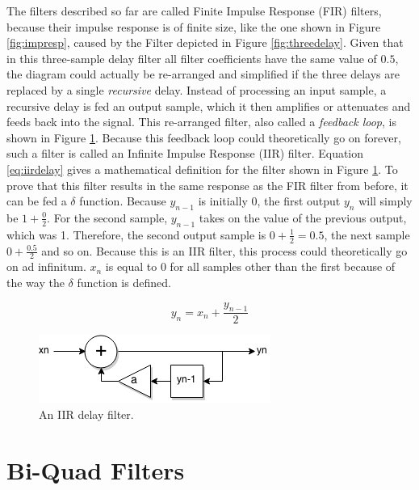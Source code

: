 \documentclass[12pt,twoside]{report}
\begin{document}
\noindent The filters described so far are called Finite Impulse Response (FIR) filters, because their impulse response is of finite size, like the one shown in Figure \ref{fig:impresp}, caused by the Filter depicted in Figure \ref{fig:threedelay}. Given that in this three-sample delay filter all filter coefficients have the same value of $0.5$, the diagram could actually be re-arranged and simplified if the three delays are replaced by a single \emph{recursive} delay. Instead of processing an input sample, a recursive delay is fed an output sample, which it then amplifies or attenuates and feeds back into the signal. This re-arranged filter, also called a \emph{feedback loop}, is shown in Figure \ref{fig:iirdelay}. Because this feedback loop could theoretically go on forever, such a filter is called an Infinite Impulse Response (IIR) filter. Equation \ref{eq:iirdelay} gives a mathematical definition for the filter shown in Figure \ref{fig:iirdelay}. To prove that this filter results in the same response as the FIR filter from before, it can be fed a $\delta$ function. Because $y_{n-1}$ is initially 0, the first output $y_{n}$ will simply be $1 + \frac{0}{2}$. For the second sample, $y_{n-1}$ takes on the value of the previous output, which was 1. Therefore, the second output sample is $0 + \frac{1}{2} = 0.5$, the next sample $0 + \frac{0.5}{2}$ and so on. Because this is an IIR filter, this process could theoretically go on ad infinitum. $x_{n}$ is equal to 0 for all samples other than the first because of the way the $\delta$ function is defined.

\begin{equation}
  y_{n} = x_{n} + \frac{y_{n-1}}{2}
  \label{eq:iirdelay}
\end{equation}

\begin{figure}
  \includegraphics[scale=0.7]{img/iirdelay}
  \caption{An IIR delay filter.}
  \label{fig:iirdelay}
\end{figure}

\pagebreak

\section{Bi-Quad Filters}
\end{document}
